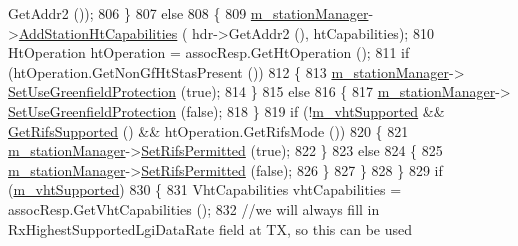 \begin{DoxyCode}
      GetAddr2 ());
806                     \}
807                   \textcolor{keywordflow}{else}
808                     \{
809                       \hyperlink{classns3_1_1RegularWifiMac_a76d1a5e27b64bfe36f24a55d1eea2775}{m\_stationManager}->\hyperlink{classns3_1_1WifiRemoteStationManager_ae78d843a98a66ff2d8584da8ed189b4d}{AddStationHtCapabilities} (
      hdr->GetAddr2 (), htCapabilities);
810                       HtOperation htOperation = assocResp.GetHtOperation ();
811                       \textcolor{keywordflow}{if} (htOperation.GetNonGfHtStasPresent ())
812                         \{
813                           \hyperlink{classns3_1_1RegularWifiMac_a76d1a5e27b64bfe36f24a55d1eea2775}{m\_stationManager}->
      \hyperlink{classns3_1_1WifiRemoteStationManager_af420085117ec1e0f26fc494cc978ab7d}{SetUseGreenfieldProtection} (\textcolor{keyword}{true});
814                         \}
815                       \textcolor{keywordflow}{else}
816                         \{
817                           \hyperlink{classns3_1_1RegularWifiMac_a76d1a5e27b64bfe36f24a55d1eea2775}{m\_stationManager}->
      \hyperlink{classns3_1_1WifiRemoteStationManager_af420085117ec1e0f26fc494cc978ab7d}{SetUseGreenfieldProtection} (\textcolor{keyword}{false});
818                         \}
819                       \textcolor{keywordflow}{if} (!\hyperlink{classns3_1_1RegularWifiMac_a151f330fdeb3f83f9ec7cf07537f0e86}{m\_vhtSupported} && \hyperlink{classns3_1_1RegularWifiMac_aee913cae11540b2878873ca3ac968afc}{GetRifsSupported} () && 
      htOperation.GetRifsMode ())
820                         \{
821                           \hyperlink{classns3_1_1RegularWifiMac_a76d1a5e27b64bfe36f24a55d1eea2775}{m\_stationManager}->\hyperlink{classns3_1_1WifiRemoteStationManager_a61a25c7485e65131a0ebba3993d6744a}{SetRifsPermitted} (\textcolor{keyword}{true});
822                         \}
823                       \textcolor{keywordflow}{else}
824                         \{
825                           \hyperlink{classns3_1_1RegularWifiMac_a76d1a5e27b64bfe36f24a55d1eea2775}{m\_stationManager}->\hyperlink{classns3_1_1WifiRemoteStationManager_a61a25c7485e65131a0ebba3993d6744a}{SetRifsPermitted} (\textcolor{keyword}{false});
826                         \}
827                     \}
828                 \}
829               \textcolor{keywordflow}{if} (\hyperlink{classns3_1_1RegularWifiMac_a151f330fdeb3f83f9ec7cf07537f0e86}{m\_vhtSupported})
830                 \{
831                   VhtCapabilities vhtCapabilities = assocResp.GetVhtCapabilities ();
832                   \textcolor{comment}{//we will always fill in RxHighestSupportedLgiDataRate field at TX, so this can be used
}
\end{DoxyCode}
